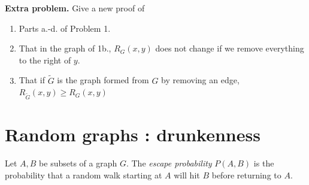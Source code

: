 \documentclass[11pt,fleqn]{book} %
\begin{document}
\begin{problem} \textbf{Extra problem.}
  Give a new proof of 
  \begin{enumerate}[label =\alph*.]
   \item Parts a.-d. of Problem 1.
   \item That in the graph of 1b., $R_{G}(x,y)$ does not change if we remove everything to the right of $y$.  
   \item That if $\tilde{G}$ is the graph formed from $G$ by removing an edge, $R_{\tilde{G}}(x,y)\ge R_G(x,y)$
  \end{enumerate}
\end{problem}























\newpage 
    \chapter{Random graphs : drunkenness}

\setcounter{problem}{0}







\begin{definition}
  Let $A,B$ be subsets of a graph $G$. The \emph{escape probability} $P(A,B)$ is the probability that a random walk starting at $A$ will hit $B$ before returning to $A$. 
\end{definition}
\end{document}
